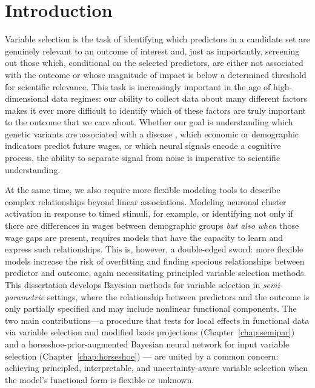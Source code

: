 
\chapter{Introduction}
\label{chap:intro}

Variable selection is the task of identifying which
predictors in a candidate set are genuinely relevant to an outcome of
interest and, just as importantly, screening out those which, conditional on the selected predictors, are either not associated with the outcome or whose magnitude of impact is below a determined threshold for scientific relevance.  This task is increasingly important in the age of high-dimensional data regimes: our ability to collect data about many different factors makes it ever more difficult to identify which of these factors are truly important to the outcome that we care about.  Whether our goal is understanding which genetic variants are associated with a disease \citep{tibshirani1996lasso}, which economic or demographic indicators predict future wages, or which neural signals encode a cognitive process, the ability to separate signal from noise is imperative to scientific understanding.

At the same time, we also require more flexible modeling tools to describe complex relationships beyond linear associations.  Modeling neuronal cluster activation in response to timed stimuli, for example, or identifying not only if there are differences in wages between demographic groups \textit{but also when} those wage gaps are present, requires models that have the capacity to learn and express such relationships.  This is, however, a double-edged sword: more flexible models increase the risk of overfitting and finding specious relationships between predictor and outcome, again necessitating principled variable selection methods.  
This dissertation develops Bayesian methods for variable selection in \emph{semi-parametric} settings, where the relationship between predictors and the outcome is only partially specified and may include nonlinear functional components. The two main contributions---a procedure
that tests for local effects in functional data via variable selection and modified basis projections (Chapter~\ref{chap:semipar}) and a horseshoe-prior-augmented Bayesian neural network for input variable selection (Chapter~\ref{chap:horseshoe}) --- are united by a common concern: 
achieving principled, interpretable, and uncertainty-aware variable selection when the model's functional form is flexible or unknown.


